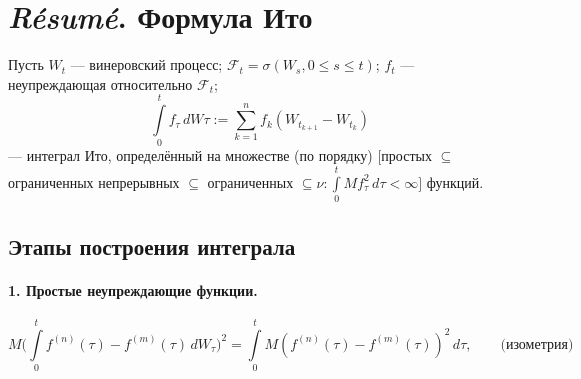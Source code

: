 \section{\emph{Résumé}. Формула Ито}
Пусть $ W_t $ --- винеровский процесс; $ \mathscr{F}_t = \sigma(W_s, 0 \leqslant
s \leqslant t)$; $ f_t $ --- неупреждающая относительно $ \mathscr{F}_t $;
\[
  \int\limits_{0}^{t} f_\tau\,dW\tau := \sum\limits_{k=1}^n f_k (W_{t_{k+1}} -
    W_{t_k})
\]
  --- интеграл Ито, определённый на множестве (по порядку) $\bigg[$простых $ \subseteq $
    ограниченных непрерывных $ \subseteq $ ограниченных $ \subseteq \nu\colon
\int\limits_{0}^{t}Mf^2_\tau\,d\tau < \infty\bigg]$ функций.

\subsection{Этапы построения интеграла}
\paragraph{1. Простые неупреждающие функции.}
\[
  M \bigg( \int\limits_{0}^{t}f^{(n)}(\tau) - f^{(m)}(\tau)\,dW_\tau \bigg)^2 =
  \int\limits_{0}^{t} M(f^{(n)}(\tau) - f^{(m)}(\tau))^2\,d\tau, \qquad
  \text{(изометрия)}
\]



